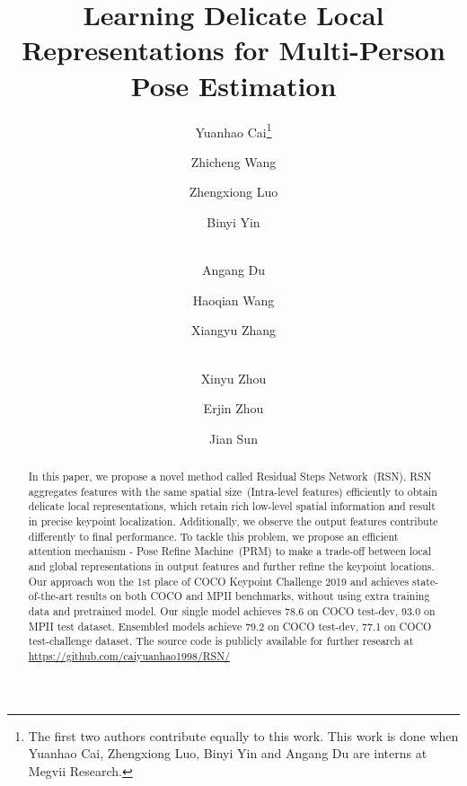 \documentclass[runningheads]{llncs}
\begin{document}
\pagestyle{headings}
\mainmatter


\title{Learning Delicate Local Representations for Multi-Person Pose Estimation} 



\author{
    Yuanhao Cai\thanks{The first two authors contribute equally to this work. This work is done when Yuanhao Cai, Zhengxiong Luo, Binyi Yin and Angang Du  are interns at Megvii Research.} \and Zhicheng Wang \and Zhengxiong Luo  \and Binyi Yin\and \\Angang Du  \and Haoqian Wang \and Xiangyu Zhang \and \\Xinyu Zhou\and Erjin Zhou  \and Jian Sun \\
}
    
\maketitle

\begin{abstract}
In this paper, we propose a novel method called Residual Steps Network~(RSN). RSN aggregates features  with the same spatial size~(Intra-level features) efficiently to obtain delicate local representations, which retain rich low-level spatial information and result in precise keypoint localization. Additionally, we observe the output features contribute differently to final performance. To tackle this problem, we propose an efficient attention mechanism - Pose Refine Machine~(PRM) to make a trade-off between local and global representations in output features and further refine the keypoint locations. Our approach won the 1st place of COCO Keypoint Challenge 2019 and achieves state-of-the-art results on both COCO and MPII benchmarks, without using extra training data and pretrained model. Our single model achieves 78.6 on COCO test-dev, 93.0 on MPII test dataset. Ensembled models achieve 79.2 on COCO test-dev, 77.1 on COCO test-challenge dataset. The source code is publicly available for further research at \url{https://github.com/caiyuanhao1998/RSN/}

\end{abstract}
\end{document}
